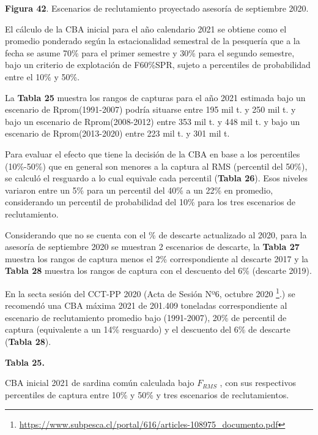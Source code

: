 \documentclass[
  spanish,
]{article}
\begin{document}
\small

\textbf{Figura 42}. Escenarios de reclutamiento proyectado asesoría de
septiembre 2020. \vspace{0.5cm} \normalsize

El cálculo de la CBA inicial para el año calendario 2021 se obtiene como
el promedio ponderado según la estacionalidad semestral de la pesquería
que a la fecha se asume 70\% para el primer semestre y 30\% para el
segundo semestre, bajo un criterio de explotación de F60\%SPR, sujeto a
percentiles de probabilidad entre el 10\% y 50\%.

La \textbf{Tabla 25} muestra los rangos de capturas para el año 2021
estimada bajo un escenario de Rprom(1991-2007) podría situarse entre 195
mil t. y 250 mil t. y bajo un escenario de Rprom(2008-2012) entre 353
mil t. y 448 mil t. y bajo un escenario de Rprom(2013-2020) entre 223
mil t. y 301 mil t.

Para evaluar el efecto que tiene la decisión de la CBA en base a los
percentiles (10\%-50\%) que en general son menores a la captura al RMS
(percentil del 50\%), se calculó el resguardo a lo cual equivale cada
percentil (\textbf{Tabla 26}). Esos niveles variaron entre un 5\% para
un percentil del 40\% a un 22\% en promedio, considerando un percentil
de probabilidad del 10\% para los tres escenarios de reclutamiento.

Considerando que no se cuenta con el \% de descarte actualizado al 2020,
para la asesoría de septiembre 2020 se muestran 2 escenarios de
descarte, la \textbf{Tabla 27} muestra los rangos de captura menos el
2\% correspondiente al descarte 2017 y la \textbf{Tabla 28} muestra los
rangos de captura con el descuento del 6\% (descarte 2019).

En la secta sesión del CCT-PP 2020 (Acta de Sesión Nº6, octubre 2020
\footnote{\url{https://www.subpesca.cl/portal/616/articles-108975_documento.pdf}}.)
se recomendó una CBA máxima 2021 de 201.409 toneladas correspondiente al
escenario de reclutamiento promedio bajo (1991-2007), 20\% de percentil
de captura (equivalente a un 14\% resguardo) y el descuento del 6\% de
descarte (\textbf{Tabla 28}).

\vspace{0.5cm}

\small
\begin{center} 
\textbf{Tabla 25.}
\end{center}
\begin{center} 
\vspace{-0.2cm} CBA inicial 2021 de sardina común calculada bajo $F_{RMS}$ , con sus respectivos percentiles de captura entre 10\% y 50\% y tres escenarios de reclutamientos.
\end{center}
\vspace{-0.2cm}
\end{document}
